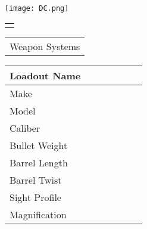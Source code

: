 \documentclass[Cover.tex]{subfiles}
\begin{document}
\begin{minipage}[t]{2cm} 
	\texttt{[image: DC.png]}
	\begin{tabular}{p{1.5cm}|}
		\\
		\hline
		\\[5.5cm]
	\end{tabular}
\end{minipage}
\hfill
\begin{minipage}[t]{11cm}
	\begin{minipage}[t]{3cm}
		\begin{tabular}{ p{8cm} }			
			\huge Weapon Systems\\[1cm]			
		\end{tabular}
	\end{minipage}
		
	\begin{tabular}{ | p{1.5cm} | p{1cm} | p{1cm} | p{1cm} | p{1cm} | p{1cm} | p{1cm} |}
		\hline
		\tiny Loadout Name &  &  &  &  &  &  \\ [2mm]
		\hline
		\tiny Make &  &  &  &  &  &  \\ [2mm]
		\hline
		\tiny Model & & & & & & \\ [2mm]
		\hline
		\tiny Caliber & & & & & & \\ [2mm]
		\hline
		\tiny Bullet Weight & & & & & & \\ [2mm]
		\hline
		\tiny Barrel Length & & & & & & \\ [2mm]
		\hline
		\tiny Barrel Twist & & & & & & \\ [2mm]
		\hline
		\tiny Sight Profile & & & & & & \\ [2mm]
		\hline
		\tiny Magnification & & & & & & \\ [2mm]
		\hline
	\end{tabular}
\end{minipage}
\end{document}
